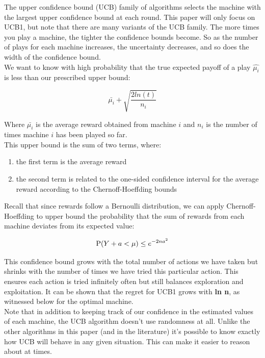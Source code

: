 \documentclass{article}
\begin{document}
The upper confidence bound (UCB) family of algorithms selects the machine with the largest upper confidence bound at each round. This paper will only focus on UCB1, but note that there are many variants of the UCB family. The more times you play a machine, the tighter the confidence bounds become. So as the number of plays for each machine increases, the uncertainty decreases, and so does the width of the confidence bound.\\

We want to know with high probability that the true expected payoff of a play $\hat{\mu_i}$ is less than our prescribed upper bound:

$$\bar{\mu_{i}} + \sqrt{\frac{2 ln (t)}{n_i}}$$

Where $\bar{\mu_{i}}$ is the average reward obtained from machine $i$ and $n_i$ is the number of times machine $i$ has been played so far.\\

This upper bound is the sum of two terms, where:

\begin{enumerate}
\item the first term is the average reward
\item the second term is related to the one-sided confidence interval for the average reward according to the Chernoff-Hoeffding bounds
\end{enumerate}

Recall that since rewards follow a Bernoulli distribution, we can apply Chernoff-Hoeffding to upper bound the probability that the sum of rewards from each machine deviates from its expected value:

$$\displaystyle \textup{P}(Y + a < \mu) \leq e^{-2na^2}$$

This confidence bound grows with the total number of actions we have taken but shrinks with the number of times we have tried this particular action. This ensures each action is tried infinitely often but still balances exploration and exploitation. It can be shown that the regret for UCB1 grows with \textbf{ln n}, as witnessed below for the optimal machine.\\

Note that in addition to keeping track of our confidence in the estimated values of each machine, the UCB algorithm doesn’t use randomness at all. Unlike the other algorithms in this paper (and in the literature) it’s possible to know exactly how UCB will behave in any given situation. This can make it easier to reason about at times.
\end{document}
